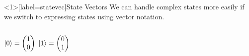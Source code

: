 \documentclass{beamer}
\begin{document}
\begin{frame}<1>[label=statevec]{State Vectors}
    We can handle complex states more easily if we switch to expressing states using vector notation.\\
    \vfill
    
    \centering
    \begin{columns}
        \centering
        \begin{math}
            \ket{0} = \begin{pmatrix}
                1 \\ 0
            \end{pmatrix}
        \end{math}
        \centering
        \begin{math}
            \ket{1} = \begin{pmatrix}
                0 \\ 1
            \end{pmatrix}
        \end{math}
    \end{columns}\vfill
\end{frame}
\end{document}
